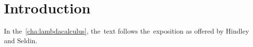 \chapter*{Introduction}

In the~\autoref{cha:lambdacalculus}, the~text follows the~exposition as offered
by Hindley and Seldin\cite{hindley_seldin_2008}.

